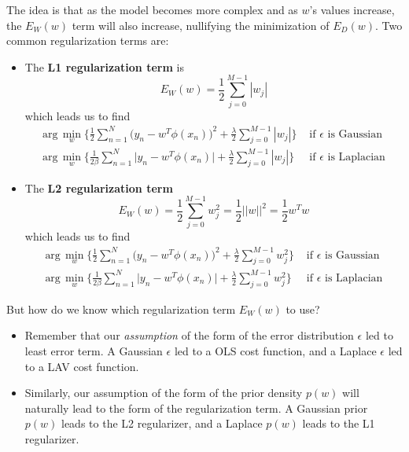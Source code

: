   The idea is that as the model becomes more complex and as $w$'s values increase, the $E_W (w)$ term will also increase, nullifying the minimization of $E_D (w)$. Two common regularization terms are:
  \begin{itemize}
    \item The \textbf{L1 regularization term} is
    \begin{equation}
      E_W (w) = \frac{1}{2} \sum_{j=0}^{M-1} |w_j|
    \end{equation}
    which leads us to find
    \begin{align*}
      \text{arg}\, \min_w \bigg\{ \frac{1}{2} \sum_{n=1}^N \big( y_n - w^T \phi(x_n) \big)^2  + \frac{\lambda}{2} \sum_{j=0}^{M-1} |w_j| \bigg\} & \text{ if } \epsilon \text{ is Gaussian} \\
      \text{arg}\, \min_w \bigg\{ \frac{1}{2 \beta} \sum_{n=1}^N \big| y_n - w^T \phi(x_n) \big| + \frac{\lambda}{2} \sum_{j=0}^{M-1} |w_j| \bigg\} & \text{ if } \epsilon \text{ is Laplacian}
    \end{align*}

    \item The \textbf{L2 regularization term}
    \begin{equation}
      E_W (w) = \frac{1}{2} \sum_{j=0}^{M-1} w_j^2 = \frac{1}{2} ||w||^2 = \frac{1}{2} w^T w
    \end{equation}
    which leads us to find
    \begin{align*}
      \text{arg}\, \min_w \bigg\{ \frac{1}{2} \sum_{n=1}^N \big( y_n - w^T \phi(x_n) \big)^2  + \frac{\lambda}{2} \sum_{j=0}^{M-1} w_j^2 \bigg\} & \text{ if } \epsilon \text{ is Gaussian} \\
      \text{arg}\, \min_w \bigg\{ \frac{1}{2 \beta} \sum_{n=1}^N \big| y_n - w^T \phi(x_n) \big| + \frac{\lambda}{2} \sum_{j=0}^{M-1} w_j^2 \bigg\} & \text{ if } \epsilon \text{ is Laplacian}
    \end{align*}
  \end{itemize}

  But how do we know which regularization term $E_W (w)$ to use?
  \begin{itemize}
    \item Remember that our \textit{assumption} of the form of the error distribution $\epsilon$ led to least error term. A Gaussian $\epsilon$ led to a OLS cost function, and a Laplace $\epsilon$ led to a LAV cost function.
    \item Similarly, our assumption of the form of the prior density $p(w)$ will naturally lead to the form of the regularization term. A Gaussian prior $p(w)$ leads to the L2 regularizer, and a Laplace $p(w)$ leads to the L1 regularizer.
  \end{itemize}

